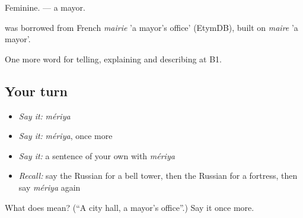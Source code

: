 Feminine. \emph{} — a mayor.

\begin{cousinweb}
\emph{} was borrowed from French \emph{mairie} 'a mayor's office' (EtymDB), built on \emph{maire} 'a mayor'.
\end{cousinweb}

\begin{grammarlens}[title={What you've built}]
One more word for telling, explaining and describing at B1.
\end{grammarlens}

\subsection*{Your turn}
\begin{itemize}
\raggedright
  \item \emph{Say it:} \emph{mériya}
  \item \emph{Say it:} \emph{mériya}, once more
  \item \emph{Say it:} a sentence of your own with \emph{mériya}
  \item \emph{Recall:} say the Russian for a bell tower, then the Russian for a fortress, then say \emph{mériya} again
\end{itemize}

\begin{tcolorbox}[breakable,colback=teal!4,colframe=teal!35!black,title={Before you move on}]
What does  mean? (\textquotedblleft{}A city hall, a mayor's office\textquotedblright{}.) Say it once more.
\end{tcolorbox}
